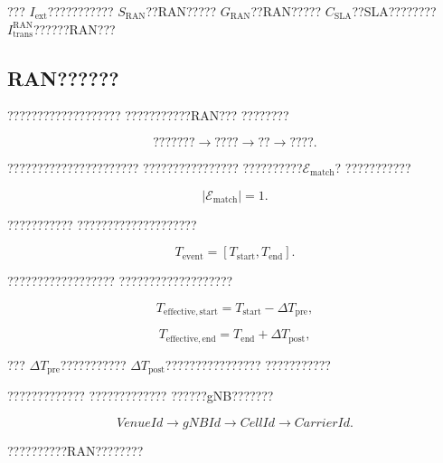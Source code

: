 ???
$I_{\mathrm{ext}}$???????????
$S_{\mathrm{RAN}}$??RAN?????
$G_{\mathrm{RAN}}$??RAN?????
$C_{\mathrm{SLA}}$??SLA????????
$I_{\mathrm{trans}}^{\mathrm{RAN}}$??????RAN???


\subsection*{RAN??????}

???????????????????
???????????RAN???
????????

\begin{equation}
\text{???????}
\rightarrow
\text{????}
\rightarrow
\text{??}
\rightarrow
\text{????}.
\label{eq:scope_resolution_chain}
\end{equation}

??????????????????????
????????????????
??????????$\mathcal{E}_{\mathrm{match}}$?
???????????

\begin{equation}
\left|
\mathcal{E}_{\mathrm{match}}
\right|
=
1.
\label{eq:unique_event_requirement}
\end{equation}

???????????
????????????????????

\begin{equation}
T_{\mathrm{event}}
=
\left[
T_{\mathrm{start}},
T_{\mathrm{end}}
\right].
\label{eq:event_time_scope}
\end{equation}

??????????????????
???????????????????

\begin{equation}
T_{\mathrm{effective,start}}
=
T_{\mathrm{start}}
-
\Delta T_{\mathrm{pre}},
\label{eq:policy_effective_start}
\end{equation}

\begin{equation}
T_{\mathrm{effective,end}}
=
T_{\mathrm{end}}
+
\Delta T_{\mathrm{post}},
\label{eq:policy_effective_end}
\end{equation}

???
$\Delta T_{\mathrm{pre}}$???????????
$\Delta T_{\mathrm{post}}$????????????????
???????????

?????????????
?????????????
??????gNB???????

\begin{equation}
VenueId
\rightarrow
gNBId
\rightarrow
CellId
\rightarrow
CarrierId.
\label{eq:venue_ran_mapping}
\end{equation}

??????????RAN????????

